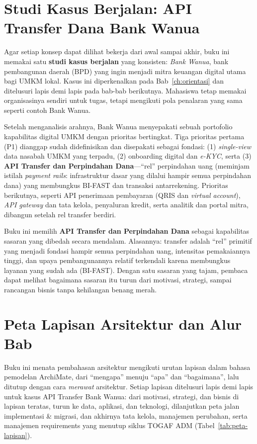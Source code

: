 \section{Studi Kasus Berjalan: API Transfer Dana Bank Wanua}
\label{sec:studi-kasus-berjalan}

Agar setiap konsep dapat dilihat bekerja dari awal sampai akhir, buku ini
memakai satu \textbf{studi kasus berjalan} yang konsisten: \emph{Bank Wanua},
bank pembangunan daerah (BPD) yang ingin menjadi mitra keuangan digital utama
bagi UMKM lokal. Kasus ini diperkenalkan pada Bab~\ref{ch:orientasi} dan
ditelusuri lapis demi lapis pada bab-bab berikutnya. Mahasiswa tetap memakai
organisasinya sendiri untuk tugas, tetapi mengikuti pola penalaran yang sama
seperti contoh Bank Wanua.

Setelah menganalisis arahnya, Bank Wanua menyepakati sebuah portofolio
kapabilitas digital UMKM dengan prioritas bertingkat. Tiga prioritas pertama
(P1) dianggap sudah didefinisikan dan disepakati sebagai fondasi: (1)
\emph{single-view} data nasabah UMKM yang terpadu, (2) onboarding digital dan
\emph{e-KYC}, serta (3) \textbf{API Transfer dan Perpindahan Dana}---``rel''
perpindahan uang (meminjam istilah \emph{payment rails}: infrastruktur dasar
yang dilalui hampir semua perpindahan dana) yang membungkus BI-FAST dan
transaksi antarrekening. Prioritas
berikutnya, seperti API penerimaan pembayaran (QRIS dan \emph{virtual
account}), \emph{API gateway} dan tata kelola, penyaluran kredit, serta
analitik dan portal mitra, dibangun setelah rel transfer berdiri.

Buku ini memilih \textbf{API Transfer dan Perpindahan Dana} sebagai kapabilitas
sasaran yang dibedah secara mendalam. Alasannya: transfer adalah ``rel''
primitif yang menjadi fondasi hampir semua perpindahan uang, intensitas
pemakaiannya tinggi, dan upaya pembangunannya relatif terkendali karena
membungkus layanan yang sudah ada (BI-FAST). Dengan satu sasaran yang tajam,
pembaca dapat melihat bagaimana sasaran itu turun dari motivasi, strategi,
sampai rancangan bisnis tanpa kehilangan benang merah.

\section{Peta Lapisan Arsitektur dan Alur Bab}
\label{sec:peta-lapisan}

Buku ini menata pembahasan arsitektur mengikuti urutan lapisan dalam bahasa
pemodelan ArchiMate, dari ``mengapa'' menuju ``apa'' dan ``bagaimana'', lalu
ditutup dengan cara \emph{merawat} arsitektur. Setiap lapisan ditelusuri lapis
demi lapis untuk kasus API Transfer Bank Wanua: dari motivasi, strategi, dan
bisnis di lapisan teratas, turun ke data, aplikasi, dan teknologi, dilanjutkan
peta jalan implementasi \& migrasi, dan akhirnya tata kelola, manajemen
perubahan, serta manajemen requirements yang menutup siklus TOGAF ADM
(Tabel~\ref{tab:peta-lapisan}).

